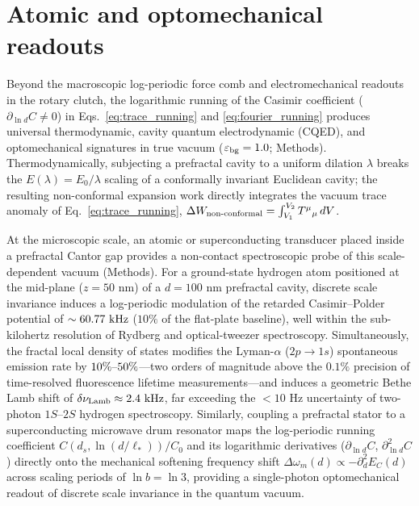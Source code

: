 \documentclass[pdflatex,sn-nature]{sn-jnl}
\begin{document}
\section*{Atomic and optomechanical readouts}
\label{sec:cqed_optomech}

Beyond the macroscopic log-periodic force comb and electromechanical readouts in the rotary clutch, the logarithmic running of the Casimir coefficient ($\partial_{\ln d}C \neq 0$) in Eqs.~\eqref{eq:trace_running} and \eqref{eq:fourier_running} produces universal thermodynamic, cavity quantum electrodynamic (CQED), and optomechanical signatures in true vacuum ($\varepsilon_{\rm bg}=1.0$; Methods). Thermodynamically, subjecting a prefractal cavity to a uniform dilation $\lambda$ breaks the $E(\lambda) = E_0/\lambda$ scaling of a conformally invariant Euclidean cavity; the resulting non-conformal expansion work directly integrates the vacuum trace anomaly of Eq.~\eqref{eq:trace_running}, $\Delta W_{\rm non\text{-}conformal} = \int_{V_1}^{V_2} T^\mu{}_\mu \, dV$.

At the microscopic scale, an atomic or superconducting transducer placed inside a prefractal Cantor gap provides a non-contact spectroscopic probe of this scale-dependent vacuum (Methods). For a ground-state hydrogen atom positioned at the mid-plane ($z = 50\text{ nm}$) of a $d = 100\text{ nm}$ prefractal cavity, discrete scale invariance induces a log-periodic modulation of the retarded Casimir--Polder potential\cite{casimirpolder1948} of $\sim 60.77{}\text{ kHz}$ ($10\%$ of the flat-plate baseline), well within the sub-kilohertz resolution of Rydberg and optical-tweezer spectroscopy\cite{safronova2018}. Simultaneously, the fractal local density of states modifies the Lyman-$\alpha$ ($2p \to 1s$) spontaneous emission rate\cite{purcell1946} by $10{}\%\text{--}50{}\%$---two orders of magnitude above the $0.1\%$ precision of time-resolved fluorescence lifetime measurements\cite{lodahl2015}---and induces a geometric Bethe Lamb shift\cite{bethe1947} of $\delta\nu_{\rm Lamb} \approx 2.4{}\text{ kHz}$, far exceeding the $<10\text{ Hz}$ uncertainty of two-photon $1S\text{--}2S$ hydrogen spectroscopy\cite{parthey2011}. Similarly, coupling a prefractal stator to a superconducting microwave drum resonator\cite{casimir_drum2025} maps the log-periodic running coefficient $C(d_s, \ln(d/\ell_*))/C_0$ and its logarithmic derivatives ($\partial_{\ln d}C$, $\partial_{\ln d}^2 C$) directly onto the mechanical softening frequency shift $\Delta\omega_m(d) \propto -\partial_d^2 E_C(d)$ across scaling periods of $\ln b = \ln 3$, providing a single-photon optomechanical readout of discrete scale invariance in the quantum vacuum.
\end{document}
